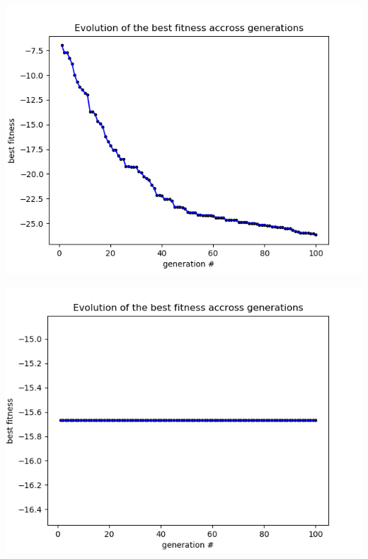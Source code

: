 \documentclass[12pt]{article}
\begin{document}
				\begin{minipage}{0.6\linewidth}
					\includegraphics[width=\linewidth]{13.png}
				\end{minipage}
				\hfill
				\begin{minipage}{0.6\linewidth}
					\includegraphics[width=\linewidth]{14.png}
				\end{minipage}
\end{document}
